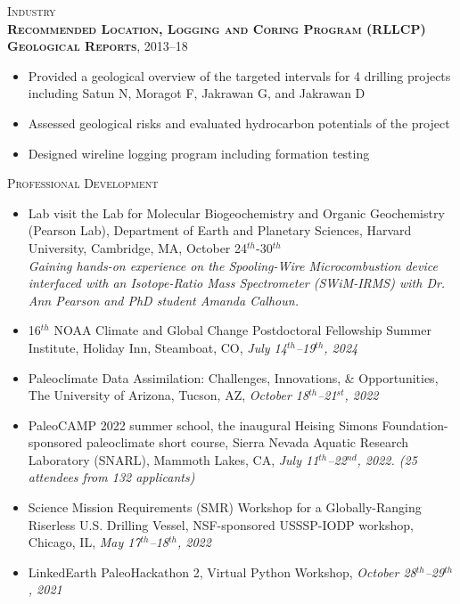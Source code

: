 \documentclass[10pt, letter]{article}
\newcommand{\margintext}[1]{\marginnote{\normalsize\textbf #1 |}}
\begin{document}
\bigskip
\textsc{Industry} \\
\textsc{\textbf{Recommended Location, Logging and Coring Program (RLLCP) Geological Reports}}, 2013–18
\begin{itemize}[leftmargin=*]
    \item Provided a geological overview of the targeted intervals for 4 drilling projects including Satun N, Moragot F, Jakrawan G, and Jakrawan D
    \item Assessed geological risks and evaluated hydrocarbon potentials of the project
    \item Designed wireline logging program including formation testing
\end{itemize} 

\bigskip
\margintext{Workshops}
\textsc{Professional Development}

\begin{itemize}[leftmargin=*]
    \item[] Lab visit the Lab for Molecular Biogeochemistry and Organic Geochemistry (Pearson Lab), Department of Earth and Planetary Sciences, Harvard University, Cambridge, MA, October 24$^{th}$-30$^{th}$ \\
    \footnotesize 
    {\color{gray} \textit{Gaining hands-on experience on the Spooling-Wire Microcombustion device interfaced with an Isotope-Ratio Mass Spectrometer (SWiM-IRMS) with Dr. Ann Pearson and PhD student Amanda Calhoun.}}

    \normalsize
    \item[] 16$^{th}$ NOAA Climate and Global Change Postdoctoral Fellowship Summer Institute, Holiday Inn, Steamboat, CO, \textit{July 14$^{th}$–19$^{th}$, 2024}
    \item[] Paleoclimate Data Assimilation: Challenges, Innovations, \& Opportunities, The University of Arizona, Tucson, AZ, \textit{October 18$^{th}$–21$^{st}$, 2022}
    \item[] PaleoCAMP 2022 summer school, the inaugural Heising Simons Foundation-sponsored paleoclimate short course, Sierra Nevada Aquatic Research Laboratory (SNARL), Mammoth Lakes, CA, \textit{July 11$^{th}$–22$^{nd}$, 2022. (25 attendees from 132 applicants)}
    \item[] Science Mission Requirements (SMR) Workshop for a Globally-Ranging Riserless U.S. Drilling Vessel, NSF-sponsored USSSP-IODP workshop, Chicago, IL, \textit{May 17$^{th}$–18$^{th}$, 2022}
    \item[] LinkedEarth PaleoHackathon 2, Virtual Python Workshop, \textit{October 28$^{th}$–29$^{th}$, 2021}
\end{itemize} 
\end{document}
